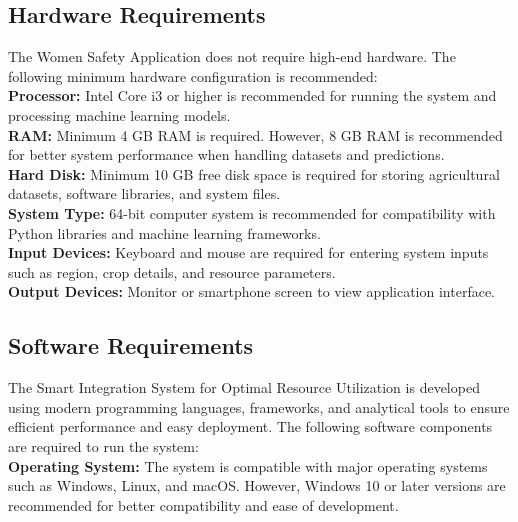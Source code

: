 \documentclass[a4paper,12pt]{report}
\begin{document}
\subsection{Hardware Requirements}

The Women Safety Application does not require high-end hardware. The following minimum hardware configuration is recommended:\\

\textbf{Processor:} Intel Core i3 or higher is recommended for running the system and processing machine learning models.\\

\textbf{RAM:} Minimum 4 GB RAM is required. However, 8 GB RAM is recommended for better system performance when handling datasets and predictions.\\

\textbf{Hard Disk:} Minimum 10 GB free disk space is required for storing agricultural datasets, software libraries, and system files.\\

\textbf{System Type:} 64-bit computer system is recommended for compatibility with Python libraries and machine learning frameworks.\\

\textbf{Input Devices:} Keyboard and mouse are required for entering system inputs such as region, crop details, and resource parameters.\\

\textbf{Output Devices:} Monitor or smartphone screen to view application interface.\\



\subsection{Software Requirements}

The Smart Integration System for Optimal Resource Utilization is developed using modern programming languages, frameworks, and analytical tools to ensure efficient performance and easy deployment. The following software components are required to run the system:\\

\textbf{Operating System:} The system is compatible with major operating systems such as Windows, Linux, and macOS. However, Windows 10 or later versions are recommended for better compatibility and ease of development.\\
\end{document}
